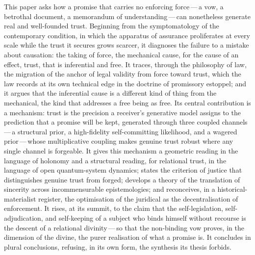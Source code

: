 \noindent
This paper asks how a promise that carries no enforcing force\,---\,a vow, a betrothal document, a memorandum of understanding\,---\,can nonetheless generate real and well-founded trust. Beginning from the symptomatology of the contemporary condition, in which the apparatus of assurance proliferates at every scale while the trust it secures grows scarcer, it diagnoses the failure to a mistake about causation: the taking of force, the mechanical cause, for the cause of an effect, trust, that is inferential and free. It traces, through the philosophy of law, the migration of the anchor of legal validity from force toward trust, which the law records at its own technical edge in the doctrine of promissory estoppel; and it argues that the inferential cause is a different kind of thing from the mechanical, the kind that addresses a free being as free. Its central contribution is a mechanism: trust is the precision a receiver's generative model assigns to the prediction that a promise will be kept, generated through three coupled channels\,---\,a structural prior, a high-fidelity self-committing likelihood, and a wagered prior\,---\,whose multiplicative coupling makes genuine trust robust where any single channel is forgeable. It gives this mechanism a geometric reading in the language of holonomy and a structural reading, for relational trust, in the language of open quantum-system dynamics; states the criterion of justice that distinguishes genuine trust from forged; develops a theory of the translation of sincerity across incommensurable epistemologies; and reconceives, in a historical-materialist register, the optimisation of the juridical as the decentralisation of enforcement. It rises, at its summit, to the claim that the self-legislation, self-adjudication, and self-keeping of a subject who binds himself without recourse is the descent of a relational divinity\,---\,so that the non-binding vow proves, in the dimension of the divine, the purer realisation of what a promise is. It concludes in plural conclusions, refusing, in its own form, the synthesis its thesis forbids.
